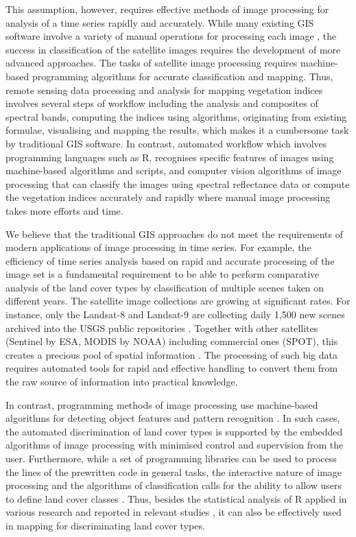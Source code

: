 \documentclass[12pt,a4paper,oneside]{article}
\def \newpar{\vspace{6pt}}
\begin{document}
\newpar This assumption, however, requires effective methods of image processing for analysis of a time series rapidly and accurately. While many existing GIS software involve a variety of manual operations for processing each image \citep{TAPPAN200738,SPIEKERMANN2015113,EPUH2022100067}, the success in classification of the satellite images requires the development of more advanced approaches. The tasks of satellite image processing requires machine-based programming algorithms for accurate classification and mapping. Thus, remote sensing data processing and analysis for mapping vegetation indices involves several steps of workflow including the analysis and composites of spectral bands, computing the indices using algorithms, originating from existing formulae, visualising and mapping the results, which makes it a cumbersome task by traditional GIS software. In contrast, automated workflow which involves programming languages such as R, recognises specific features of images using machine-based algorithms and scripts, and computer vision algorithms of image processing that can classify the images using spectral reflectance data or compute the vegetation indices accurately and rapidly where manual image processing takes more efforts and time. 

\newpar We believe that the traditional GIS approaches do not meet the requirements of modern applications of image processing in time series. For example, the efficiency of time series analysis based on rapid and accurate processing of the image set is a fundamental requirement to be able to perform comparative analysis of the land cover types by classification of multiple scenes taken on different years. The satellite image collections are growing at significant rates. For instance, only the Landsat-8 and Landsat-9 are collecting daily 1,500 new scenes archived into the USGS public repositories \citep{USGS}. Together with other satellites (Sentinel by ESA, MODIS by NOAA) including commercial ones (SPOT), this creates a precious pool of spatial information \citep{MainiAgrawal}. The processing of such big data requires automated tools for rapid and effective handling to convert them from the raw source of information into practical knowledge. 

\newpar In contrast, programming methods of image processing use machine-based algorithms for detecting object features and pattern recognition \citep{9297369,jimaging8120317,8882177,9121731}. In such cases, the automated discrimination of land cover types is supported by the embedded algorithms of image processing with minimised control and supervision from the user. Furthermore, while a set of programming libraries can be used to process the lines of the prewritten code in general tasks, the interactive nature of image processing and the algorithms of classification calls for the ability to allow users to define land cover classes \citep{Liuetal2009}. Thus, besides the statistical analysis of R applied in various research and reported in relevant studies \citep{BIVAND20001043,Lemenkova201991,GRUNSKY20021219}, it can also be effectively used in mapping for discriminating land cover types. 
\end{document}

